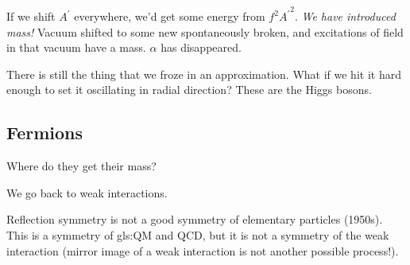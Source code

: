 \documentclass[]{article}
\begin{document}
If we shift $A^\prime$ everywhere, we'd get some energy from $f^2 {A^\prime}^2$. \emph{We have introduced mass!} Vacuum shifted to some new spontaneously broken, and excitations of field in that vacuum have a mass. $\alpha$ has disappeared.

There is still the thing that we froze in an approximation. What if we hit it hard enough to set it oscillating in radial direction? These are the Higgs bosons.
 
\subsection{Fermions}

Where do they get their mass?

We go back to weak interactions.

Reflection symmetry is not a good symmetry of elementary particles (1950s). This is a symmetry of \gls{gls:QM} and QCD, but it is not a symmetry of the weak interaction (mirror image of a weak interaction is not another possible process!). 
\end{document}
